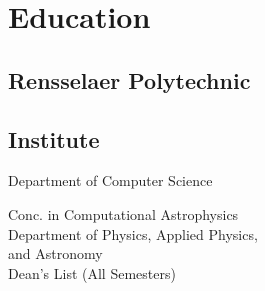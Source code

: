 \documentclass[letterpaper]{deedy-resume} %
\begin{document}

\lastupdated %



\begin{minipage}[t]{0.33\textwidth} %


\section{Education} 

\subsection{Rensselaer Polytechnic}
\subsection{Institute}

Department of Computer Science\\

Conc. in Computational Astrophysics \\
Department of Physics, Applied Physics,\\
and Astronomy\\
Dean's List (All Semesters) \\



\end{minipage}
\end{document}
